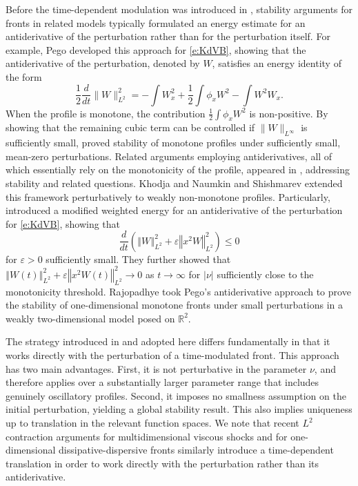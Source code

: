 \documentclass[final,11pt]{article}
\renewcommand{\leq}{\leqslant}
\theoremstyle{definition} %
\newcommand{\lv}{\left\Vert}
\newcommand{\rv}{\right\Vert}
\newcommand{\half}{\frac{1}{2}}
\theoremstyle{plain}
\theoremstyle{definition} %
\theoremstyle{remark}
\begin{document}
Before the time-dependent modulation was introduced in \cite{BARKER2025}, stability arguments for fronts in related models typically formulated an energy estimate for an antiderivative of the perturbation rather than for the perturbation itself. For example, Pego \cite{Pego} developed this approach for \eqref{e:KdVB}, showing that the antiderivative of the perturbation, denoted by $W$, satisfies an energy identity of the form
\[
\half \frac{d}{dt} \| W \|_{L^2}^2 = -\int W_x^2 + \half \int \phi_xW^2 - \int W^2W_x.
\]
When the profile is monotone, the contribution $\half\int\phi_xW^2$ is non-positive. By showing that the remaining cubic term can be controlled if $\|W\|_{L^\infty}$ is sufficiently small, \cite{Pego} proved stability of monotone profiles under sufficiently small, mean-zero perturbations. Related arguments employing antiderivatives, all of which essentially rely on the monotonicity of the profile, appeared in \cite{ACH2014,Engler,goodman1989stability,Wang}, addressing stability and related questions. Khodja \cite{Khodja} and Naumkin and Shishmarev \cite{naumkinShishmarev} extended this framework perturbatively to weakly non-monotone profiles. Particularly, \cite{naumkinShishmarev} introduced a modified weighted energy for an antiderivative of the perturbation for \eqref{e:KdVB}, showing that
\[ 
\frac{d}{dt} ( \lv W \rv_{L^2}^2 + \varepsilon \lv x^2 W \rv_{L^2}^2  )  \leq 0
\]
for $\varepsilon>0$ sufficiently small. They further showed that $\lv W(t) \rv_{L^2}^2 + \varepsilon \lv x^2 W(t) \rv_{L^2}^2 \to 0 $ as $t\to\infty$ for $|\nu|$ sufficiently close to the monotonicity threshold. Rajopadhye \cite{Raj1996} took Pego's antiderivative approach to prove the stability of one-dimensional monotone fronts under small perturbations in a weakly two-dimensional model posed on $\mathbb{R}^2$.

The strategy introduced in \cite{BARKER2025} and adopted here differs fundamentally in that it works directly with the perturbation of a time-modulated front. This approach has two main advantages. First, it is not perturbative in the parameter $\nu$, and therefore applies over a substantially larger parameter range that includes genuinely oscillatory profiles. Second, it imposes no smallness assumption on the initial perturbation, yielding a global stability result. This also implies uniqueness up to translation in the relevant function spaces. We note that recent $L^2$ contraction arguments for multidimensional viscous shocks \cite{kang2025multiDburgers,wangNSviscous2024} and for one-dimensional dissipative-dispersive fronts \cite{chen2026} similarly introduce a time-dependent translation in order to work directly with the perturbation rather than its antiderivative. 
\end{document}
